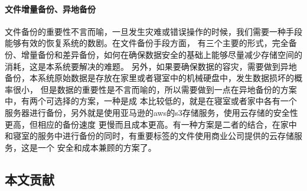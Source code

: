 \paragraph{文件增量备份、异地备份}
文件备份的重要性不言而喻，一旦发生灾难或错误操作的时候，我们需要一种手段能够有效的恢复系统的数剧。在文件备份手段方面，
有三个主要的形式，完全备份、增量备份和差异备份，如何在确保数据安全的基础上能够尽量减少存储空间的消耗，这是本系统要解决的难题。
另外，如果要确保数据的容灾，需要做到异地备份，本系统原始数据是存放在家里或者寝室中的机械硬盘中，发生数据损坏的概率很小，
但是数据的重要性是不言而喻的，所以需要做到一点在异地备份的方案中，有两个可选择的方案，一种是成
本比较低的，就是在寝室或者家中各有一个服务器进行备份，另外就是使用亚马逊的aws的s3存储服务，使用云存储的安全性更高，但相应的备份速度
更慢而且成本更高\cite{r25}。有一种方案是二者的结合，在家中和寝室的服务中进行备份的同时，有重要标签的文件使用商业公司提供的云存储服务，这是一个
安全和成本兼顾的方案了。


\subsection{本文贡献}

